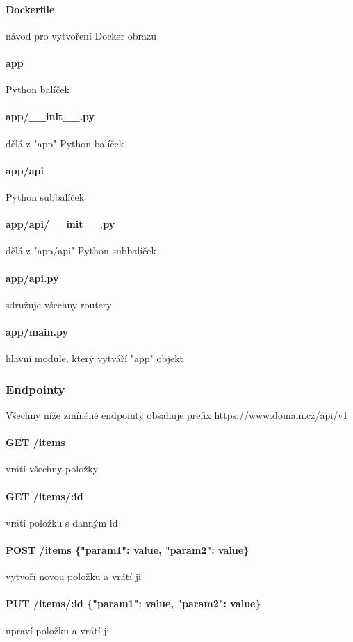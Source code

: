 \documentclass[12pt, a4paper]{article}
\begin{document}
\paragraph{Dockerfile}
návod pro vytvoření Docker obrazu
\paragraph{app}
Python balíček
\paragraph{app/\_\_init\_\_.py}
dělá z "app" Python balíček
\paragraph{app/api}
Python subbalíček
\paragraph{app/api/\_\_init\_\_.py}
dělá z "app/api" Python subbalíček
\paragraph{app/api.py}
sdružuje všechny routery
\paragraph{app/main.py}
hlavní module, který vytváří "app" objekt
\subsubsection{Endpointy}
Všechny níže zmíněné endpointy obsahuje prefix https://www.domain.cz/api/v1
\paragraph{GET /items}
vrátí všechny položky
\paragraph{GET /items/:id}
vrátí položku s danným id
\paragraph{POST /items \{"param1": value, "param2": value\}}
vytvoří novou položku a vrátí ji
\paragraph{PUT /items/:id \{"param1": value, "param2": value\}}
upraví položku a vrátí ji
\end{document}
